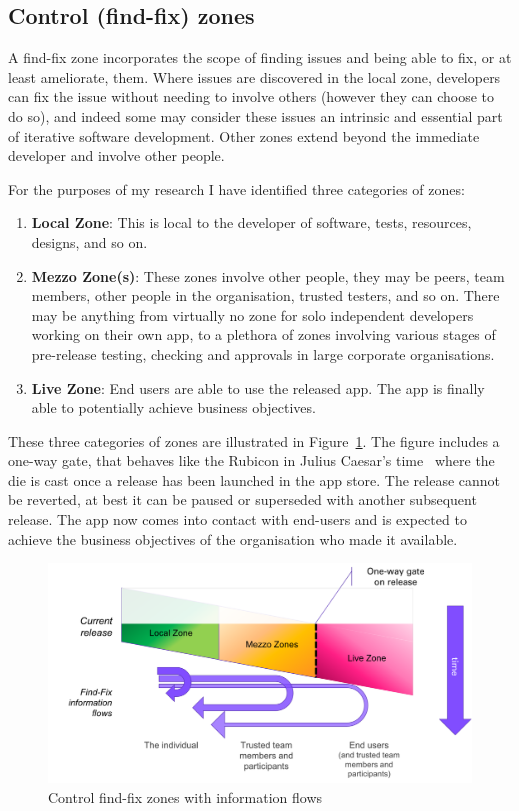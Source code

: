 \subsection{Control (find-fix) zones}
A find-fix zone incorporates the scope of finding issues and being able to fix, or at least ameliorate, them. Where issues are discovered in the local zone, developers can fix the issue without needing to involve others (however they can choose to do so), and indeed some may consider these issues an intrinsic and essential part of iterative software development. Other zones extend beyond the immediate developer and involve other people.

For the purposes of my research I have identified three categories of zones:
\begin{enumerate}
    \item \textbf{Local Zone}: This is local to the developer of software, tests, resources, designs, and so on.
    \item \textbf{Mezzo Zone(s)}: These zones involve other people, they may be peers, team members, other people in the organisation, trusted testers, and so on. There may be anything from virtually no zone for solo independent developers working on their own app, to a plethora of zones involving various stages of pre-release testing, checking and approvals in large corporate organisations.
    \item \textbf{Live Zone}: End users are able to use the released app. The app is finally able to potentially achieve business objectives. 
\end{enumerate}

These three categories of zones are illustrated in Figure~\ref{fig:my:control-find-fix-zones-with-information-flows}. The figure includes a one-way gate, that behaves like the Rubicon in Julius Caesar's time~ where the die is cast once a release has been launched in the app store. The release cannot be reverted, at best it can be paused or superseded with another subsequent release. The app now comes into contact with end-users and is expected to achieve the business objectives of the organisation who made it available.

\begin{figure}
    \includegraphics[width=\linewidth]{images/my/control-find-fix-zones-with-information-flows.pdf}
    \caption{Control find-fix zones with information flows}
    \label{fig:my:control-find-fix-zones-with-information-flows}
\end{figure}

